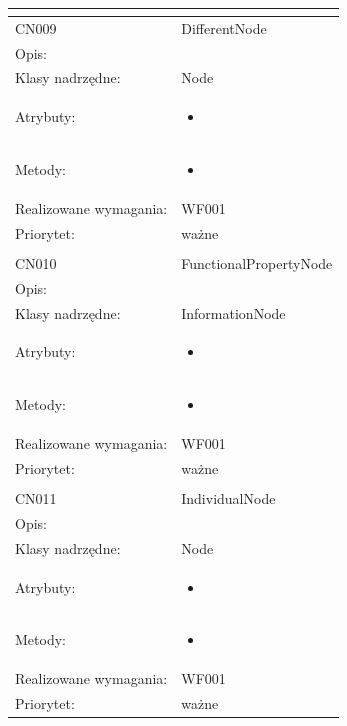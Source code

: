 \documentclass[a4paper,10pt]{article}
\begin{document}
\begin{center}
\begin{longtable}{|m{3cm}|m{9cm}|}
\multicolumn{2}{c}{} \\
 \hline

CN009 & DifferentNode \\ \hline
Opis: &     \\ \hline
Klasy nadrzędne: & Node     \\ \hline
Atrybuty: & \begin{itemize}
 \item 
\end{itemize}
 \\ \hline
Metody: & \begin{itemize}
 \item 
\end{itemize}
  \\ \hline
Realizowane wymagania: & WF001 \\ \hline
Priorytet: & ważne  \\ \hline

\multicolumn{2}{c}{} \\
 \hline

CN010 & FunctionalPropertyNode \\ \hline
Opis: &     \\ \hline
Klasy nadrzędne: & InformationNode     \\ \hline
Atrybuty: & \begin{itemize}
 \item 
\end{itemize}
 \\ \hline
Metody: & \begin{itemize}
 \item 
\end{itemize}
  \\ \hline
Realizowane wymagania: & WF001 \\ \hline
Priorytet: & ważne  \\ \hline

\multicolumn{2}{c}{} \\
 \hline

CN011 & IndividualNode \\ \hline
Opis: &     \\ \hline
Klasy nadrzędne: & Node     \\ \hline
Atrybuty: & \begin{itemize}
 \item 
\end{itemize}
 \\ \hline
Metody: & \begin{itemize}
 \item 
\end{itemize}
  \\ \hline
Realizowane wymagania: & WF001 \\ \hline
Priorytet: & ważne  \\ \hline


\end{longtable}
\end{center}
\end{document}
